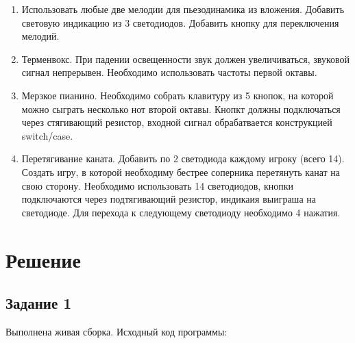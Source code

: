 \documentclass[a4paper,14pt]{extarticle}
\begin{document}
  \begin{enumerate}
    \item Использовать любые две мелодии для пьезодинамика из вложения. Добавить световую индикацию из 3 светодиодов. Добавить кнопку для переключения мелодий.
    \item Терменвокс. При падении освещенности звук должен увеличиваться, звуковой сигнал непрерывен. Необходимо использовать частоты первой октавы.
    \item Мерзкое пианино. Необходимо собрать клавитуру из 5 кнопок, на которой можно сыграть несколько нот второй октавы. Кнопкт должны подключаться через стягивающий резистор, входной сигнал обрабатвается конструкцией switch/case.
    \item Перетягивание каната. Добавить по 2 светодиода каждому игроку (всего 14). Создать игру, в которой необходиму бестрее соперника перетянуть канат на свою сторону. Необходимо использовать 14 светодиодов, кнопки подключаются через подтягивающий резистор, индикаия выиграша на светодиоде. Для перехода к следующему светодиоду необходимо 4 нажатия.
  \end{enumerate}

  \newpage
  \section*{\hspace{12.5mm}Решение}
  \subsection*{\hspace{12.5mm}Задание 1}
  Выполнена живая сборка. Исходный код программы:
\end{document}
